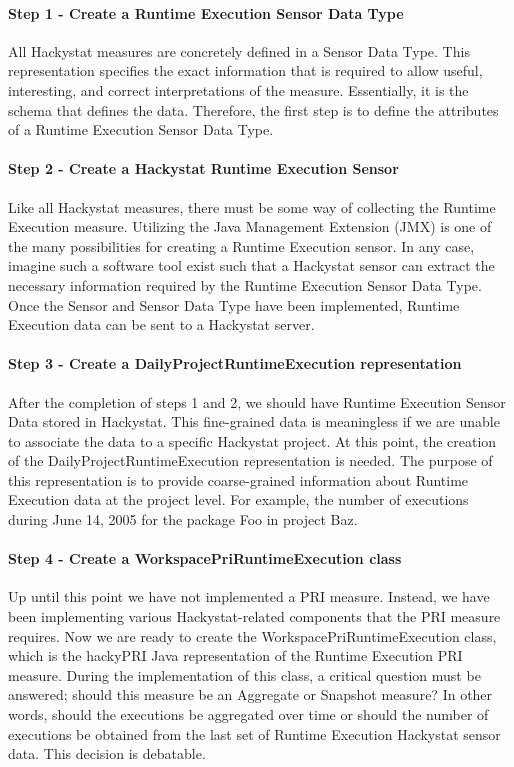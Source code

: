 \paragraph{Step 1 - Create a Runtime Execution Sensor Data Type} All
Hackystat measures are concretely defined in a Sensor Data Type. This
representation specifies the exact information that is required to allow
useful, interesting, and correct interpretations of the measure.
Essentially, it is the schema that defines the data. Therefore, the first
step is to define the attributes of a Runtime Execution Sensor Data Type.

\paragraph{Step 2 - Create a Hackystat Runtime Execution Sensor} Like all
Hackystat measures, there must be some way of collecting the Runtime
Execution measure. Utilizing the Java Management Extension (JMX) is one of
the many possibilities for creating a Runtime Execution sensor. In any
case, imagine such a software tool exist such that a Hackystat sensor can
extract the necessary information required by the Runtime Execution Sensor
Data Type.  Once the Sensor and Sensor Data Type have been implemented,
Runtime Execution data can be sent to a Hackystat server.

\paragraph{Step 3 - Create a DailyProjectRuntimeExecution representation}
After the completion of steps 1 and 2, we should have Runtime Execution
Sensor Data stored in Hackystat. This fine-grained data is meaningless if
we are unable to associate the data to a specific Hackystat project. At
this point, the creation of the DailyProjectRuntimeExecution representation
is needed. The purpose of this representation is to provide coarse-grained
information about Runtime Execution data at the project level. For example,
the number of executions during June 14, 2005 for the package Foo in
project Baz.

\paragraph{Step 4 - Create a WorkspacePriRuntimeExecution class}
Up until this point we have not implemented a PRI measure. Instead, we have
been implementing various Hackystat-related components that the PRI measure
requires. Now we are ready to create the WorkspacePriRuntimeExecution
class, which is the hackyPRI Java representation of the Runtime Execution
PRI measure. During the implementation of this class, a critical question
must be answered; should this measure be an Aggregate or Snapshot measure?
In other words, should the executions be aggregated over time or should the
number of executions be obtained from the last set of Runtime Execution
Hackystat sensor data. This decision is debatable.

